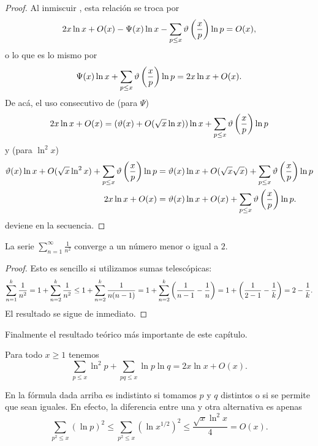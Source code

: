 \begin{proof}
  Al inmiscuir , esta relaci\'on se troca por
  \[
    2x\ln x + O(x) - \Psi(x)\ln x
    - \sum_{p \leq x} \vartheta\left( \frac{x}{p} \right)\ln p = O(x),
  \]
  o lo que es lo mismo por
  \[
    \Psi(x)\ln x + \sum_{p \leq x} \vartheta\left( \frac{x}{p} \right)\ln p = 2x\ln x + O(x).
  \]
  De ac\'a, el uso consecutivo de
   (para \(\Psi\))
  \[
    2x\ln x + O(x)
    = (\vartheta(x) + O(\sqrt{x}\ln x))\ln x +
    \sum_{p \leq x} \vartheta\left( \frac{x}{p} \right)\ln p \\  
  \]
  y  (para \(\ln^2 x\))
  \begin{align*}
    \vartheta(x)\ln x + O(\sqrt{x}\ln^2 x) + \sum_{p \leq x} \vartheta\left( \frac{x}{p} \right)\ln p
    &= \vartheta(x)\ln x + O(\sqrt{x}\sqrt{x}) + \sum_{p \leq x} \vartheta\left( \frac{x}{p} \right)\ln p \\
    2x\ln x + O(x)
    &= \vartheta(x)\ln x + O(x) + \sum_{p \leq x} \vartheta\left( \frac{x}{p} \right)\ln p.
  \end{align*}
  deviene en la secuencia.
\end{proof}

\begin{lemma}
  \label{lem:sum-1-n2}
  La serie \(\displaystyle{\sum_{n = 1}^\infty \frac{1}{n ^ 2}}\)
  converge a un n\'umero menor o igual a \(2\).
\end{lemma}

\begin{proof}
  Esto es sencillo si utilizamos sumas telesc\'opicas: 
  \[
    \sum_{n = 1}^k \frac{1}{n^2}
    = 1 + \sum_{n = 2}^k \frac{1}{n^2} 
    \leq 1 + \sum_{n = 2}^k \frac{1}{n (n - 1)}
    = 1 + \sum_{n = 2}^k \left( \frac{1}{n - 1} - \frac{1}{n} \right)
    = 1 + \left( \frac{1}{2 - 1} - \frac{1}{k} \right)
    = 2 - \frac{1}{k}.
  \]
  El resultado se sigue de inmediato.
\end{proof}

Finalmente el resultado te\'orico m\'as importante de este cap\'itulo.

\begin{theorem}
  \label{thm:selberg}
  Para todo \(x \geq 1\) tenemos
  \[
    \sum_{p \leq x} \ln^2 p + \sum_{pq \leq x} \ln p \ln q = 2x\ln x + O(x).
  \]
\end{theorem}

\begin{note}
  En la f\'ormula dada arriba es indistinto si tomamos
  \(p\) y \(q\) distintos o si se permite que sean iguales.
  En efecto, la diferencia entre una y otra alternativa es apenas
  \[
    \sum_{p^2 \le x} (\ln p)^2
    \le \sum_{p^2 \le x} (\ln x^{1/2})^2
    \le \frac{\sqrt{x} \ln^2 x}{4}
    = O(x).
  \]
\end{note}

